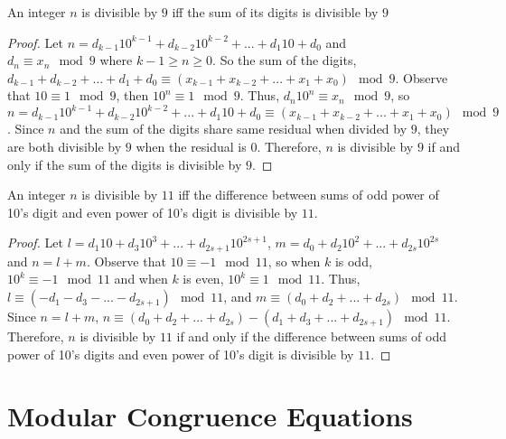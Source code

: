 \begin{theorem}
An integer $n$ is divisible by $9$ iff the sum of its digits is divisible by $9$
\end{theorem}

\begin{proof}
Let $n = d_{k-1}10^{k-1} + d_{k-2}10^{k-2} + ... + d_{1}10 + d_{0}$ and\\ $d_n \equiv x_n \mod9$ where $k-1 \geq n \geq 0$. So the sum of the digits, $d_{k-1} + d_{k-2}+ ... + d_{1}+ d_{0} \equiv (x_{k-1} + x_{k-2} + ... + x_1 + x_0) \mod 9$. Observe that $10 \equiv 1 \mod 9$, then $10^n \equiv 1 \mod 9$. Thus, $d_n10^n \equiv x_n \mod9$, so $n = d_{k-1}10^{k-1} + d_{k-2}10^{k-2} + ... + d_{1}10 + d_{0} \equiv (x_{k-1} + x_{k-2} + ... + x_1 + x_0) \mod 9$. Since $n$ and the sum of the digits share same residual when divided by $9$, they are both divisible by $9$ when the residual is $0$. Therefore, $n$ is divisible by $9$ if and only if the sum of the digits is divisible by $9$.
\end{proof}

\begin{theorem}
An integer $n$ is divisible by $11$ iff the difference between sums of odd power of 10's digit and even power of 10's digit is divisible by $11$.
\end{theorem}

\begin{proof}
Let $l = d_{1}10 + d_{3}10^3 + ... + d_{2s+1}10^{2s+1}$, $m = d_{0} + d_{2}10^2 + ... + d_{2s}10^{2s}$ and $n = l+m$. Observe that $10 \equiv -1 \mod 11$, so when $k$ is odd, $10^k \equiv -1 \mod 11$ and when $k$ is even, $10^k \equiv 1 \mod 11$. Thus, $l \equiv (-d_{1}-d_{3}-...-d_{2s+1}) \mod 11$, and $m \equiv (d_{0}+d_{2}+...+d_{2s}) \mod 11$. Since $n = l+m$, $n \equiv (d_{0}+d_{2}+...+d_{2s}) - (d_{1}+d_{3}+...+d_{2s+1}) \mod 11$. Therefore, $n$ is divisible by $11$ if and only if the difference between sums of odd power of 10's digits and even power of 10's digit is divisible by $11$.
\end{proof}
\section{Modular Congruence Equations}

